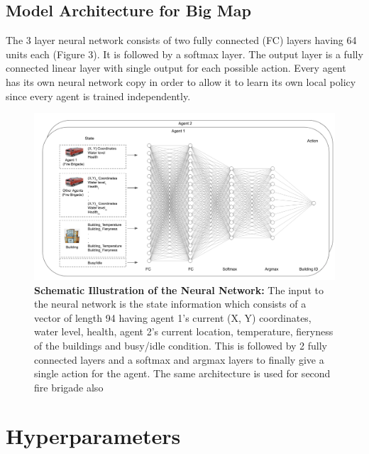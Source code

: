 \documentclass[12pt]{report}
\begin{document}
\subsection{Model Architecture for Big Map} The 3 layer neural network consists of two fully connected (FC) layers having 64 units each (Figure 3). It is followed by a softmax layer. The output layer is a fully connected linear layer with single output for each possible action. Every agent has its own neural network copy in order to allow it to learn its own local policy since every agent is trained independently. 

\begin{figure}[!h]
    \centering
    \includegraphics[width=14cm]{27}
    \caption{\textbf{Schematic Illustration of the Neural Network:} The input to the neural network is the state information which consists of a vector of length 94 having agent 1's current (X, Y) coordinates, water level, health, agent 2's current location, temperature, fieryness of the buildings and busy/idle condition. This is followed by 2 fully connected layers and a softmax and argmax layers to finally give a single action for the agent. The same architecture is used for second fire brigade also}
    \label{fig:x}
\end{figure}

\section{Hyperparameters}
\end{document}
